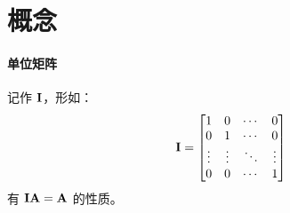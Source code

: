 \section{概念}

\paragraph{单位矩阵}
记作 $\mathbf{I}$，形如：\[
    \mathbf{I} = \begin{bmatrix}
        1 & 0 & \cdots & 0 \\
        0 & 1 & \cdots & 0 \\
        \vdots & \vdots & \ddots & \vdots \\
        0 & 0 & \cdots & 1 \\
    \end{bmatrix}
\]有 $\mathbf{I} \mathbf{A} = \mathbf{A}$ 的性质。

